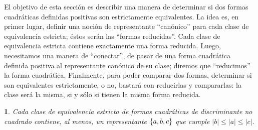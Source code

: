 \theoremstyle{plain}
\newtheorem{teoReducidas}{\teoname}[section]
\newtheorem{lemaReducidas}[teoReducidas]{\lemaname}
\newtheorem{coroReducidas}[teoReducidas]{\coroname}

\theoremstyle{definition}
\newtheorem{defReducidas}[teoReducidas]{}
\newtheorem{obsReducidas}[teoReducidas]{\obsname}
\newtheorem{ejemReducidas}[teoReducidas]{\ejemname}


El objetivo de esta secci\'on es describir una manera de determinar
si dos formas cuadr\'aticas definidas positivas son estrictamente
equivalentes.
La idea es, en primer lugar, definir una noci\'on de representante
``can\'onico'' para cada clase de equivalencia estricta; \'estos
ser\'an las ``formas reducidas''. Cada clase de equivalencia estricta
contiene exactamente una forma reducida. Luego, necesitamos una manera
de ``conectar'', de pasar de una forma cuadr\'atica definida positiva
al representante can\'onico de su clase; diremos que ``reducimos'' la
forma cuadr\'atica. Finalmente, para poder comparar dos formas, determinar
si son equivalentes estrictamente, o no, bastar\'a con reducirlas y
compararlas: la clase ser\'a la misma, si y s\'olo si tienen la misma
forma reducida.


\begin{lemaReducidas}\label{lema:reducidas}
	Cada clase de equivalencia estricta de formas cuadr\'aticas
	de discriminante no cuadrado
	contiene, al menos, un representante $\left\{a,b,c\right\}$ que cumple
	$|b|\leq |a|\leq |c|$.
\end{lemaReducidas}


